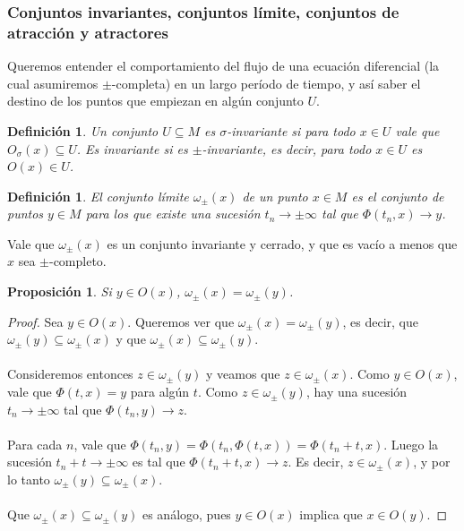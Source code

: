 \documentclass[12pt,a4paper]{article}
\newtheorem{proposition}[theorem]{Proposición}
\newtheorem{definition}[theorem]{Definición}
\begin{document}
\subsubsection{Conjuntos invariantes, conjuntos límite, conjuntos de atracción y atractores}
Queremos entender el comportamiento del flujo de una ecuación diferencial (la cual asumiremos $\pm$-completa) en un largo período de tiempo, y así saber el destino de los puntos que empiezan en algún conjunto $U$.
\begin{definition}
    Un conjunto $U \subseteq M$ es $\sigma$\textit{-invariante} si para todo  $x \in U$ vale que $O_\sigma(x) \subseteq U$. Es \textit{invariante} si es $\pm$-invariante, es decir, para todo $x \in U$ es $O(x) \in U$.
\end{definition}
\begin{definition}
    El \textit{conjunto límite} $\omega_\pm(x)$ de un punto $x \in M$ es el conjunto de puntos $y \in M$ para los que existe una sucesión $t_n \rightarrow \pm\infty$ tal que $\Phi(t_n,x) \rightarrow y$.
\end{definition}
Vale que $\omega_\pm(x)$ es un conjunto invariante y cerrado, y que es vacío a menos que $x$ sea $\pm$-completo.
\begin{proposition}
     Si $y \in O(x)$, $\omega_{\pm}(x) = \omega_{\pm}(y)$.
\end{proposition}
\begin{proof}
    Sea $y \in O(x)$. Queremos ver que $\omega_{\pm}(x) = \omega_{\pm}(y)$, es decir, que $\omega_{\pm}(y) \subseteq \omega_{\pm}(x)$ y que $\omega_{\pm}(x) \subseteq \omega_{\pm}(y)$.
    \\
    \\
    Consideremos entonces $z \in \omega_{\pm}(y)$ y veamos que $z \in \omega_{\pm}(x)$. Como $y \in O(x)$, vale que $\Phi(t,x) = y$ para algún $t$. Como $z \in \omega_{\pm}(y)$, hay una sucesión $t_n \rightarrow \pm \infty$ tal que $\Phi(t_n, y) \rightarrow z$.
    \\
    \\
    Para cada $n$, vale que $\Phi(t_n,y) = \Phi(t_n, \Phi(t,x)) = \Phi(t_n+t,x)$. Luego la sucesión $t_n + t \rightarrow \pm\infty$ es tal que $\Phi(t_n+t,x) \rightarrow z$. Es decir, $z \in \omega_{\pm}(x)$, y por lo tanto $\omega_{\pm}(y) \subseteq \omega_{\pm}(x)$.
    \\
    \\
    Que $\omega_{\pm}(x) \subseteq \omega_{\pm}(y)$ es análogo, pues $y \in O(x)$ implica que $x \in O(y)$.
\end{proof}
\end{document}
